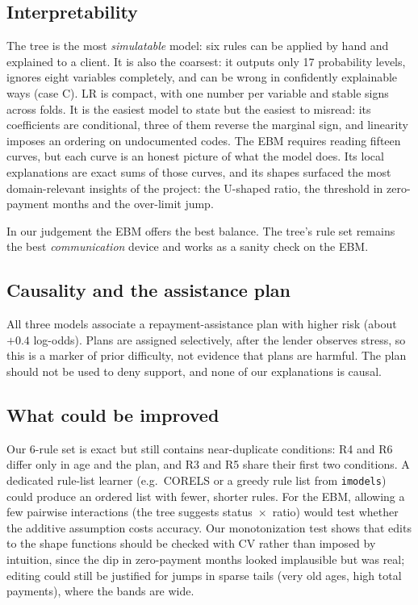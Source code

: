 \documentclass[a4paper,11pt]{article}
\begin{document}
\subsection{Interpretability}
The tree is the most \emph{simulatable} model: six rules can be applied by hand and explained to a client. It is also the coarsest: it outputs only 17 probability levels, ignores eight variables completely, and can be wrong in confidently explainable ways (case C). LR is compact, with one number per variable and stable signs across folds. It is the easiest model to state but the easiest to misread: its coefficients are conditional, three of them reverse the marginal sign, and linearity imposes an ordering on undocumented codes. The EBM requires reading fifteen curves, but each curve is an honest picture of what the model does. Its local explanations are exact sums of those curves, and its shapes surfaced the most domain-relevant insights of the project: the U-shaped ratio, the threshold in zero-payment months and the over-limit jump.

In our judgement the EBM offers the best balance. The tree's rule set remains the best \emph{communication} device and works as a sanity check on the EBM.

\subsection{Causality and the assistance plan}
All three models associate a repayment-assistance plan with higher risk (about $+0.4$ log-odds). Plans are assigned selectively, after the lender observes stress, so this is a marker of prior difficulty, not evidence that plans are harmful. The plan should not be used to deny support, and none of our explanations is causal.

\subsection{What could be improved}
Our 6-rule set is exact but still contains near-duplicate conditions: R4 and R6 differ only in age and the plan, and R3 and R5 share their first two conditions. A dedicated rule-list learner (e.g.\ CORELS or a greedy rule list from \texttt{imodels}) could produce an ordered list with fewer, shorter rules. For the EBM, allowing a few pairwise interactions (the tree suggests status~$\times$~ratio) would test whether the additive assumption costs accuracy. Our monotonization test shows that edits to the shape functions should be checked with CV rather than imposed by intuition, since the dip in zero-payment months looked implausible but was real; editing could still be justified for jumps in sparse tails (very old ages, high total payments), where the bands are wide.
\end{document}
